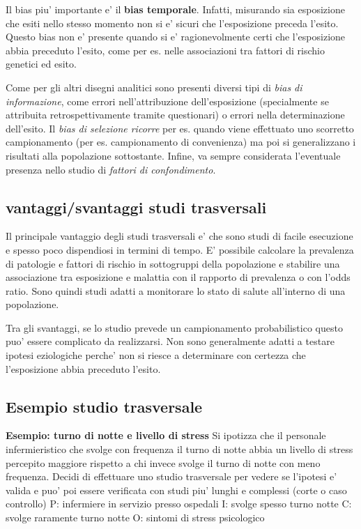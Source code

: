 \documentclass[]{book}
\begin{document}
Il bias piu' importante e' il \textbf{bias temporale}. Infatti, misurando sia esposizione che esiti nello stesso momento non si e' sicuri che l'esposizione preceda l'esito. Questo bias non e' presente quando si e' ragionevolmente certi che l'esposizione abbia preceduto l'esito, come per es. nelle associazioni tra fattori di rischio genetici ed esito.

Come per gli altri disegni analitici sono presenti diversi tipi di \emph{bias di informazione}, come errori nell'attribuzione dell'esposizione (specialmente se attribuita retrospettivamente tramite questionari) o errori nella determinazione dell'esito. Il \emph{bias di selezione ricorre} per es. quando viene effettuato uno scorretto campionamento (per es. campionamento di convenienza) ma poi si generalizzano i risultati alla popolazione sottostante. Infine, va sempre considerata l'eventuale presenza nello studio di \emph{fattori di confondimento}.

\hypertarget{vantaggisvantaggi-studi-trasversali}{%
\subsection{vantaggi/svantaggi studi trasversali}\label{vantaggisvantaggi-studi-trasversali}}

Il principale vantaggio degli studi trasversali e' che sono studi di facile esecuzione e spesso poco dispendiosi in termini di tempo. E' possibile calcolare la prevalenza di patologie e fattori di rischio in sottogruppi della popolazione e stabilire una associazione tra esposizione e malattia con il rapporto di prevalenza o con l'odds ratio. Sono quindi studi adatti a monitorare lo stato di salute all'interno di una popolazione.

Tra gli svantaggi, se lo studio prevede un campionamento probabilistico questo puo' essere complicato da realizzarsi. Non sono generalmente adatti a testare ipotesi eziologiche perche' non si riesce a determinare con certezza che l'esposizione abbia preceduto l'esito.

\hypertarget{esempio-studio-trasversale}{%
\subsection{Esempio studio trasversale}\label{esempio-studio-trasversale}}

\textbf{Esempio: turno di notte e livello di stress}
Si ipotizza che il personale infermieristico che svolge con frequenza il turno di notte abbia un livello di stress percepito maggiore rispetto a chi invece svolge il turno di notte con meno frequenza.
Decidi di effettuare uno studio trasversale per vedere se l'ipotesi e' valida e puo' poi essere verificata con studi piu' lunghi e complessi (corte o caso controllo)
P: infermiere in servizio presso ospedali I: svolge spesso turno notte
C: svolge raramente turno notte
O: sintomi di stress psicologico
\end{document}
